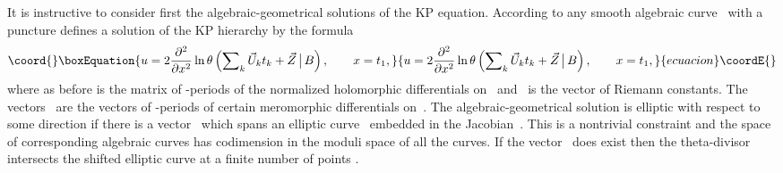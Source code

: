 \documentclass[a4paper,11pt]{article}
\providecommand{\p}{\partial}
\providecommand{\cE}{{\cal E}}
\providecommand{\vL}{\Vec{\Lambda}}
\providecommand{\vU}{\Vec{U}}
\providecommand{\vZ}{\Vec{Z}}
\theoremstyle{plain}
\theoremstyle{remark}
\begin{document}
It is instructive to consider first the algebraic-geometrical solutions of
the KP equation. According to \cite{kr} any smooth algebraic curve~\myHighlight{$\Gamma$}\coordHE{}
with a puncture defines a solution of the KP hierarchy by the formula
\begin{equation}\coord{}\boxEquation{
u=2 \frac{\p^2}{\p x^2}\ln \theta \left(\bigl.
\sum\nolimits_{k} \vU_k t_k+\vZ\, \bigr|\,B \right),\qquad x=t_1,
}{
u=2 \frac{\p^2}{\p x^2}\ln \theta \left(\bigl.
\sum\nolimits_{k} \vU_k t_k+\vZ\, \bigr|\,B \right),\qquad x=t_1,
}{ecuacion}\coordE{}\end{equation}
where as before \coordHE{} is the matrix of \coordHE{}-periods of the normalized holomorphic
differentials on~\myHighlight{$\Gamma$}\coordHE{} and~\myHighlight{$\vZ$}\coordHE{} is the vector of Riemann constants.
The vectors~\myHighlight{$\vU_k$}\coordHE{} are the vectors of \coordHE{}-periods of
certain meromorphic differentials on~\myHighlight{$\Gamma$}\coordHE{}. The algebraic-geometrical
solution is elliptic with respect to some direction if there is a
vector~\myHighlight{$\vL$}\coordHE{} which spans an elliptic curve~\myHighlight{$\cE$}\coordHE{} embedded in the
Jacobian~\coordHE{}. This is a nontrivial constraint and the space of
corresponding algebraic curves has codimension \coordHE{} in the moduli space
of all the curves. If the vector~\myHighlight{$\vL$}\coordHE{} does exist then the theta-divisor
intersects the shifted elliptic curve \myHighlight{$\cE+\sum_{k}\vU_kt_k$}\coordHE{} at
a finite number of points \coordHE{}.
\end{document}
